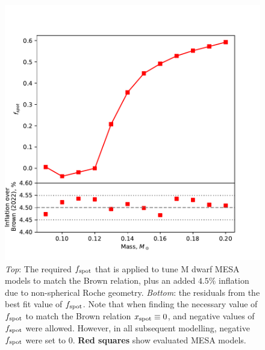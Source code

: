 \begin{figure}
    \centering
    \includegraphics[width=\textwidth]{figures/modelling/fspot_relation_to_match_brown_plus_4.5.pdf}
    \caption{{\it Top}: The required $f_{\rm spot}$ that is applied to tune M dwarf MESA models to match the Brown relation, plus an added $4.5\%$ inflation due to non-spherical Roche geometry. {\it Bottom}: the residuals from the best fit value of $f_{\rm spot}$. Note that when finding the necessary value of $f_{\rm spot}$ to match the Brown relation $x_{\rm spot} \equiv 0$, and negative values of $f_{\rm spot}$ were allowed. However, in all subsequent modelling, negative $f_{\rm spot}$ were set to 0. {\bf Red squares} show evaluated MESA models.}
    \label{fig:modelling:fspot mass relationship}
\end{figure}



